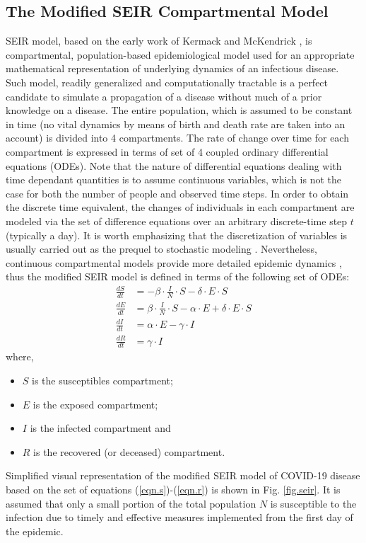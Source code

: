 \documentclass[conference]{IEEEtran}
\begin{document}
\subsection{The Modified SEIR Compartmental Model}
\label{sec.modeling.seir}
SEIR model, based on the early work of Kermack and McKendrick \cite{Kermack1991_1,Kermack1991_2,Kermack1991_3}, is compartmental, population-based epidemiological model used for an appropriate mathematical representation of underlying dynamics of an infectious disease. Such model, readily generalized and computationally tractable is a perfect candidate to simulate a propagation of a disease without much of a prior knowledge on a disease. 
The entire population, which is assumed to be constant in time (no vital dynamics by means of birth and death rate are taken into an account) is divided into 4 compartments. The rate of change over time for each compartment is expressed in terms of set of 4 coupled ordinary differential equations (ODEs). 
Note that the nature of differential equations dealing with time dependant quantities is to assume continuous variables, which is not the case for both the number of people and observed time steps. 
In order to obtain the discrete time equivalent, the changes of individuals in each compartment are modeled via the set of difference equations over an arbitrary discrete-time step $t$ (typically a day). It is worth emphasizing that the discretization of variables is usually carried out as the prequel to stochastic modeling \cite{canto_2015}. Nevertheless, continuous compartmental models provide more detailed epidemic dynamics \cite{Peng2020}, thus the modified SEIR model is defined in terms of the following set of ODEs:
\begin{align}
    \label{eqn.s}
    \frac{dS}{dt} &= - \beta \cdot \frac{I}{N} \cdot S - \delta \cdot E \cdot S \\
    \label{eqn.e}
    \frac{dE}{dt} &= \beta \cdot \frac{I}{N} \cdot S - \alpha \cdot E + \delta \cdot E \cdot S \\
    \label{eqn.i}
    \frac{dI}{dt} &= \alpha \cdot E - \gamma \cdot I \\
    \label{eqn.r}
    \frac{dR}{dt} &= \gamma \cdot I
\end{align}
where,
\begin{itemize}
    \item $S$ is the susceptibles compartment;
    \item $E$ is the exposed compartment;
    \item $I$ is the infected compartment and
    \item $R$ is the recovered (or deceased) compartment.
\end{itemize}
Simplified visual representation of the modified SEIR model of COVID-19 disease based on the set of equations (\ref{eqn.s})-(\ref{eqn.r}) is shown in Fig. \ref{fig.seir}. It is assumed that only a small portion of the total population $N$ is susceptible to the infection due to timely and effective measures implemented from the first day of the epidemic.
\end{document}
